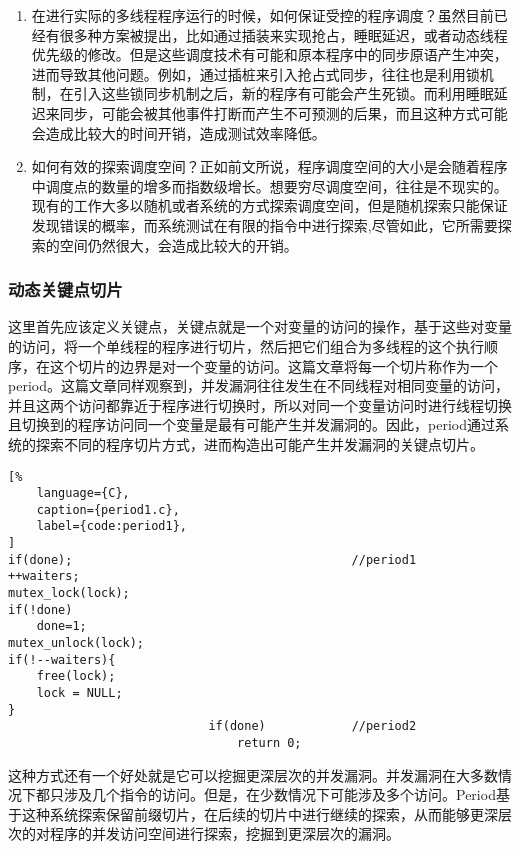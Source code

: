 \begin{enumerate}
\item 在进行实际的多线程程序运行的时候，如何保证受控的程序调度？虽然目前已经有很多种方案被提出，比如通过插装来实现抢占，睡眠延迟，或者动态线程优先级的修改。但是这些调度技术有可能和原本程序中的同步原语产生冲突，进而导致其他问题。例如，通过插桩来引入抢占式同步，往往也是利用锁机制，在引入这些锁同步机制之后，新的程序有可能会产生死锁。而利用睡眠延迟来同步，可能会被其他事件打断而产生不可预测的后果，而且这种方式可能会造成比较大的时间开销，造成测试效率降低。
\item 如何有效的探索调度空间？正如前文所说，程序调度空间的大小是会随着程序中调度点的数量的增多而指数级增长。想要穷尽调度空间，往往是不现实的。现有的工作大多以随机或者系统的方式探索调度空间，但是随机探索只能保证发现错误的概率，而系统测试在有限的指令中进行探索,尽管如此，它所需要探索的空间仍然很大，会造成比较大的开销。
\end{enumerate}

\subsubsection{动态关键点切片}

这里首先应该定义关键点，关键点就是一个对变量的访问的操作，基于这些对变量的访问，将一个单线程的程序进行切片，然后把它们组合为多线程的这个执行顺序，在这个切片的边界是对一个变量的访问。这篇文章将每一个切片称作为一个period。这篇文章同样观察到，并发漏洞往往发生在不同线程对相同变量的访问，并且这两个访问都靠近于程序进行切换时，所以对同一个变量访问时进行线程切换且切换到的程序访问同一个变量是最有可能产生并发漏洞的。因此，period通过系统的探索不同的程序切片方式，进而构造出可能产生并发漏洞的关键点切片。

\begin{spacing}{1.0}
\begin{lstlisting}[%
    language={C},
    caption={period1.c},
    label={code:period1},
]
if(done);                                       //period1
++waiters;
mutex_lock(lock); 
if(!done) 
    done=1; 
mutex_unlock(lock); 
if(!--waiters){ 
    free(lock); 
    lock = NULL; 
} 
                            if(done)            //period2
                                return 0;
\end{lstlisting}
\end{spacing}

这种方式还有一个好处就是它可以挖掘更深层次的并发漏洞。并发漏洞在大多数情况下都只涉及几个指令的访问。但是，在少数情况下可能涉及多个访问。Period基于这种系统探索保留前缀切片，在后续的切片中进行继续的探索，从而能够更深层次的对程序的并发访问空间进行探索，挖掘到更深层次的漏洞。

